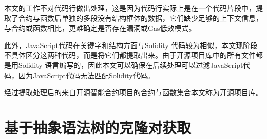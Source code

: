 本文的工作不对代码行做出处理，这是因为代码行实际上是在一个代码片段中，提取了合约与函数后单独的多段没有结构框体的数据，它们缺少足够的上下文信息，与合约或函数相比，更难确定是否存在漏洞或Gas低效模式。

此外，JavaScript代码在关键字和结构方面与Solidity 代码较为相似，本文现阶段不具体区分这两种代码，而是将它们都提取出来。由于开源项目库中的所有文件都是用Solidity 语言编写的，因此本文可以确保在后续处理可以过滤JavaScript代码，因为JavaScript代码无法匹配Solidity代码。

经过提取处理后的来自开源智能合约项目的合约与函数集合本文称为开源项目库。

\section{基于抽象语法树的克隆对获取}

